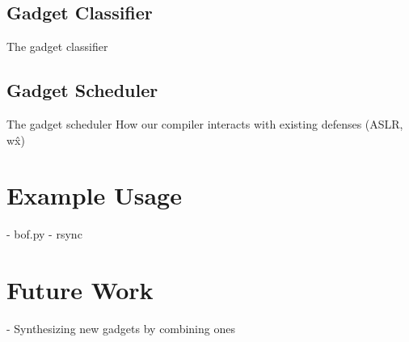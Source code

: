 \documentclass[journal]{IEEEtran}
\begin{document}
\subsection{Gadget Classifier}
The gadget classifier

\subsection{Gadget Scheduler}\label{scheduler}
The gadget scheduler
How our compiler interacts with existing defenses (ASLR, w\^x)


\section{Example Usage}
  - bof.py
  - rsync

\section{Future Work}
  - Synthesizing new gadgets by combining ones


{}
\end{document}
